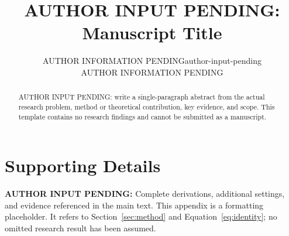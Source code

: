 \documentclass[10pt]{article}
\title{AUTHOR INPUT PENDING: Manuscript Title}
\author{\name AUTHOR INFORMATION PENDING\email author-input-pending\\\addr AUTHOR INFORMATION PENDING}
\newcommand{\AuthorPending}[1]{\textbf{AUTHOR INPUT PENDING:} #1}
\begin{document}
\maketitle
\begin{abstract}
AUTHOR INPUT PENDING: write a single-paragraph abstract from the actual research problem,
method or theoretical contribution, key evidence, and scope. This template contains
no research findings and cannot be submitted as a manuscript.
\end{abstract}


\appendix
\section{Supporting Details}
\label{app:supporting}
\AuthorPending{Complete derivations, additional settings, and evidence referenced in the main text.}
This appendix is a formatting placeholder. It refers to Section~\ref{sec:method} and
Equation~\ref{eq:identity}; no omitted research result has been assumed.
\end{document}
